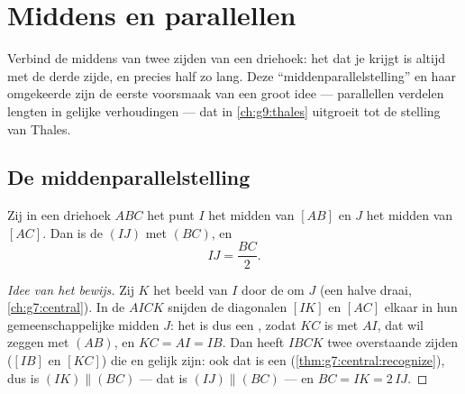 \chapter{Middens en parallellen}\label{ch:g8:midpoints}

Verbind de middens van twee zijden van een driehoek: het  dat je krijgt
is altijd  met de derde zijde, en precies half zo lang. Deze
``middenparallelstelling'' en haar omgekeerde zijn de eerste voorsmaak van een
groot idee --- parallellen verdelen lengten in gelijke verhoudingen --- dat in
\cref{ch:g9:thales} uitgroeit tot de stelling van Thales.

\section{De middenparallelstelling}

\begin{theorem}[Middenparallelstelling]\label{thm:g8:midpoints:direct}
Zij in een driehoek $ABC$ het punt $I$ het midden van $[AB]$ en $J$ het midden
van $[AC]$. Dan is de  $(IJ)$  met $(BC)$, en
\[
IJ = \frac{BC}{2} .
\]
\end{theorem}

\begin{proof}[Idee van het bewijs]
Zij $K$ het beeld van $I$ door de  om $J$ (een halve draai,
\cref{ch:g7:central}). In de  $AICK$ snijden de diagonalen $[IK]$ en
$[AC]$ elkaar in hun gemeenschappelijke midden $J$: het is dus een
, zodat $KC$  is met $AI$, dat wil zeggen met $(AB)$, en
$KC = AI = IB$. Dan heeft $IBCK$ twee overstaande zijden ($[IB]$ en $[KC]$) die
 en gelijk zijn: ook dat is een 
(\cref{thm:g7:central:recognize}), dus is $(IK) \parallel (BC)$ --- dat is
$(IJ) \parallel (BC)$ --- en $BC = IK = 2\,IJ$.
\end{proof}

